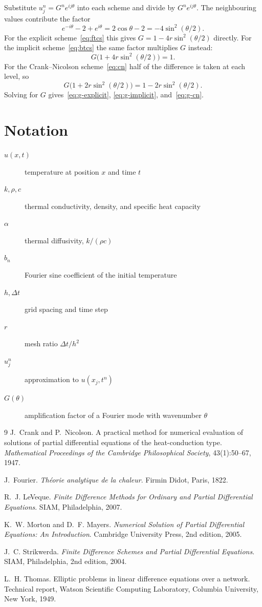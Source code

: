 \documentclass[11pt]{article}
\theoremstyle{definition}
\theoremstyle{remark}
\begin{document}
Substitute $u_j^n = G^n e^{i j \theta}$ into each scheme and divide by $G^n e^{i j \theta}$. The neighbouring values contribute the factor
\[
  e^{-i\theta} - 2 + e^{i\theta} = 2\cos\theta - 2 = -4 \sin^2(\theta/2).
\]
For the explicit scheme~\eqref{eq:ftcs} this gives $G = 1 - 4 r \sin^2(\theta/2)$ directly. For the implicit scheme~\eqref{eq:btcs} the same factor multiplies $G$ instead:
\[
  G \bigl( 1 + 4 r \sin^2(\theta/2) \bigr) = 1 .
\]
For the Crank--Nicolson scheme~\eqref{eq:cn} half of the difference is taken at each level, so
\[
  G \bigl( 1 + 2 r \sin^2(\theta/2) \bigr) = 1 - 2 r \sin^2(\theta/2).
\]
Solving for $G$ gives~\eqref{eq:g-explicit}, \eqref{eq:g-implicit}, and~\eqref{eq:g-cn}.

\section{Notation}\label{app:notation}

\begin{description}
  \item[$u(x,t)$] temperature at position $x$ and time $t$
  \item[$k, \rho, c$] thermal conductivity, density, and specific heat capacity
  \item[$\alpha$] thermal diffusivity, $k / (\rho c)$
  \item[$b_n$] Fourier sine coefficient of the initial temperature
  \item[$h, \Delta t$] grid spacing and time step
  \item[$r$] mesh ratio $\Delta t / h^2$
  \item[$u_j^n$] approximation to $u(x_j, t^n)$
  \item[$G(\theta)$] amplification factor of a Fourier mode with wavenumber $\theta$
\end{description}

\begin{thebibliography}{9}
  J.~Crank and P.~Nicolson.
  A practical method for numerical evaluation of solutions of partial differential equations of the heat-conduction type.
  \emph{Mathematical Proceedings of the Cambridge Philosophical Society}, 43(1):50--67, 1947.

  J.~Fourier.
  \emph{Th\'eorie analytique de la chaleur}.
  Firmin Didot, Paris, 1822.

  R.~J. LeVeque.
  \emph{Finite Difference Methods for Ordinary and Partial Differential Equations}.
  SIAM, Philadelphia, 2007.

  K.~W. Morton and D.~F. Mayers.
  \emph{Numerical Solution of Partial Differential Equations: An Introduction}.
  Cambridge University Press, 2nd edition, 2005.

  J.~C. Strikwerda.
  \emph{Finite Difference Schemes and Partial Differential Equations}.
  SIAM, Philadelphia, 2nd edition, 2004.

  L.~H. Thomas.
  Elliptic problems in linear difference equations over a network.
  Technical report, Watson Scientific Computing Laboratory, Columbia University, New York, 1949.
\end{thebibliography}
\end{document}
